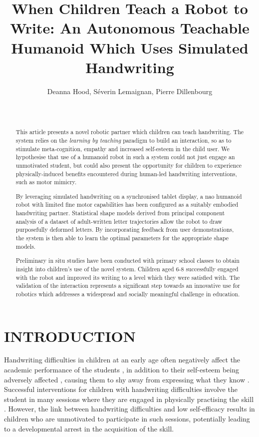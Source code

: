 \documentclass{sig-alternate}
\title{\LARGE \bf
When Children Teach a Robot to Write: An Autonomous Teachable Humanoid Which Uses Simulated Handwriting
}
\author{
\alignauthor
Deanna Hood, Séverin Lemaignan, Pierre Dillenbourg\\
   \affaddr{Computer-Human Interaction in Learning and Instruction Laboratory (CHILI)}\\
   \affaddr{École Polytechnique Fédérale de Lausanne (EPFL)}\\
   \email{firstname.lastname@epfl.ch}
}
\begin{document}
\maketitle

\begin{abstract}

This article presents a novel robotic partner which children can teach
handwriting.  The system relies on the \emph{learning by teaching} paradigm to
build an interaction, so as to stimulate meta-cognition, empathy and
increased self-esteem in the child user. We hypothesise that use of a
humanoid robot in such a system could not just engage an unmotivated student,
but could also present the opportunity for children to experience
physically-induced benefits encountered during human-led handwriting
interventions, such as motor mimicry.

By leveraging simulated handwriting on a synchronised tablet display, a {\sc
nao} humanoid robot with limited fine motor capabilities has been configured as
a suitably embodied handwriting partner. Statistical shape models derived from
principal component analysis of a dataset of adult-written letter trajectories
allow the robot to draw purposefully deformed letters. By incorporating feedback
from user demonstrations, the system is then able to learn the optimal
parameters for the appropriate shape models. 

Preliminary in situ studies have been conducted with primary school classes to
obtain insight into children's use of the novel system.  Children aged 6-8
successfully engaged with the robot and improved its writing to a level which
they were satisfied with. The validation of the interaction represents a
significant step towards an innovative use for robotics which addresses a
widespread and socially meaningful challenge in education. 

\end{abstract}


\section{INTRODUCTION}

Handwriting difficulties in children at an early age often negatively affect the
academic performance of the students \cite{Christensen2005}, in addition to
their self-esteem being adversely affected \cite{Malloy1995}, causing them to
shy away from expressing what they know \cite{Medwell2008}.  Successful
interventions for children with handwriting difficulties involve the student in
many sessions where they are engaged in physically practising the skill
\cite{Hoy2011}. However, the link between handwriting difficulties and low
self-efficacy \cite{Engel-Yeger2009} results in children who are unmotivated to
participate in such sessions, potentially leading to a developmental arrest in
the acquisition of the skill. 
\end{document}
